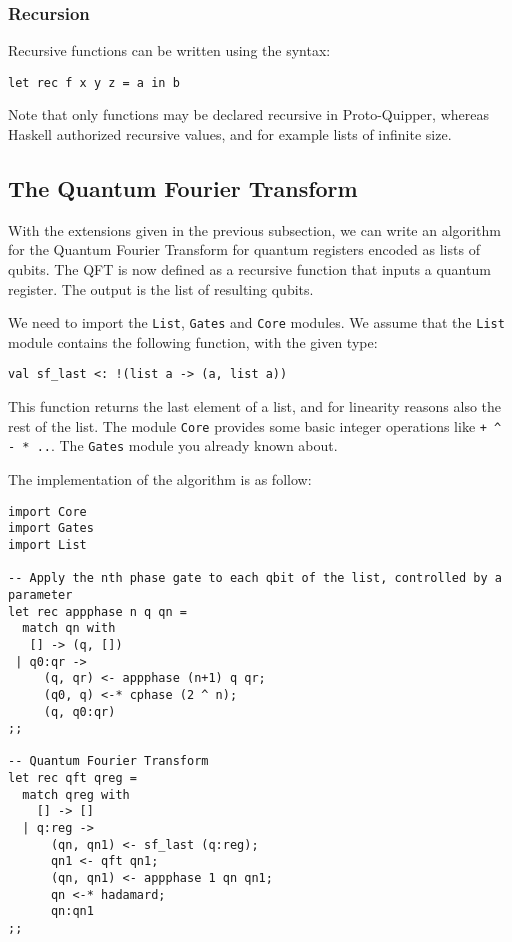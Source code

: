 \subsubsection{Recursion}

Recursive functions can be written using the syntax:
\begin{verbatim}
let rec f x y z = a in b
\end{verbatim}
Note that only functions may be declared recursive in Proto-Quipper, whereas 
Haskell authorized recursive values, and for example lists of infinite size.

\subsection{The Quantum Fourier Transform}

With the extensions given in the previous subsection, we can write an 
algorithm for the Quantum Fourier Transform for quantum registers encoded 
as lists of qubits. The QFT is now defined as a recursive function that 
inputs a quantum register. The output is the list of resulting qubits. 

We need to import the \verb#List#, \verb#Gates# and \verb#Core# modules. 
We assume that the \verb#List# module contains the following function, 
with the given type:
\begin{verbatim}
val sf_last <: !(list a -> (a, list a))
\end{verbatim}
This function returns the last element of a list, and for linearity reasons 
also the rest of the list. The module \verb#Core# provides some basic integer 
operations like \verb#+ ^ - * ..#. The \verb#Gates# module you already known 
about.

The implementation of the algorithm is as follow:

\begin{verbatim}
import Core
import Gates
import List

-- Apply the nth phase gate to each qbit of the list, controlled by a parameter
let rec appphase n q qn =
  match qn with
   [] -> (q, [])
 | q0:qr ->
     (q, qr) <- appphase (n+1) q qr;
     (q0, q) <-* cphase (2 ^ n);
     (q, q0:qr)
;;

-- Quantum Fourier Transform
let rec qft qreg =
  match qreg with
    [] -> []
  | q:reg ->
      (qn, qn1) <- sf_last (q:reg);
      qn1 <- qft qn1;
      (qn, qn1) <- appphase 1 qn qn1;
      qn <-* hadamard;
      qn:qn1
;;
\end{verbatim}
